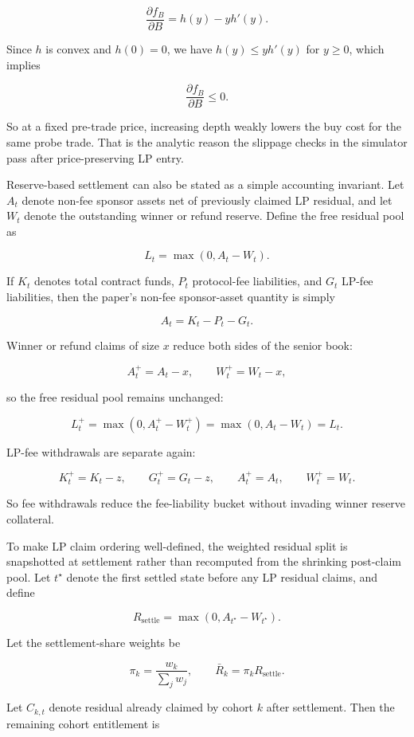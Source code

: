 \documentclass[10pt]{article}
\begin{document}
\[
\frac{\partial f_B}{\partial B} = h(y) - y h'(y).
\]

Since $h$ is convex and $h(0)=0$, we have $h(y) \le y h'(y)$ for $y \ge 0$, which implies

\[
\frac{\partial f_B}{\partial B} \le 0.
\]

So at a fixed pre-trade price, increasing depth weakly lowers the buy cost for the same probe trade. That is the analytic reason the slippage checks in the simulator pass after price-preserving LP entry.

Reserve-based settlement can also be stated as a simple accounting invariant. Let $A_t$ denote non-fee sponsor assets net of previously claimed LP residual, and let $W_t$ denote the outstanding winner or refund reserve. Define the free residual pool as

\[
L_t = \max(0, A_t - W_t).
\]

If $K_t$ denotes total contract funds, $P_t$ protocol-fee liabilities, and $G_t$ LP-fee liabilities, then the paper's non-fee sponsor-asset quantity is simply

\[
A_t = K_t - P_t - G_t.
\]

Winner or refund claims of size $x$ reduce both sides of the senior book:

\[
A_t^{+} = A_t - x,
\qquad
W_t^{+} = W_t - x,
\]

so the free residual pool remains unchanged:

\[
L_t^{+} = \max(0, A_t^{+} - W_t^{+}) = \max(0, A_t - W_t) = L_t.
\]

LP-fee withdrawals are separate again:

\[
K_t^{+} = K_t - z,
\qquad
G_t^{+} = G_t - z,
\qquad
A_t^{+} = A_t,
\qquad
W_t^{+} = W_t.
\]

So fee withdrawals reduce the fee-liability bucket without invading winner reserve collateral.

To make LP claim ordering well-defined, the weighted residual split is snapshotted at settlement rather than recomputed from the shrinking post-claim pool. Let $t^\star$ denote the first settled state before any LP residual claims, and define

\[
R_{\mathrm{settle}} = \max(0, A_{t^\star} - W_{t^\star}).
\]

Let the settlement-share weights be

\[
\pi_k = \frac{w_k}{\sum_j w_j},
\qquad
\bar R_k = \pi_k R_{\mathrm{settle}}.
\]

Let $C_{k,t}$ denote residual already claimed by cohort $k$ after settlement. Then the remaining cohort entitlement is
\end{document}
